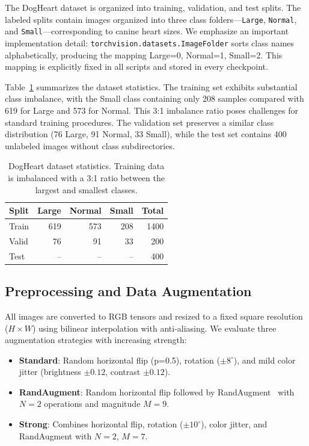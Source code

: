 \documentclass[10pt,twocolumn,letterpaper]{article}
\begin{document}
The DogHeart dataset is organized into training, validation, and test splits. The labeled splits contain images organized into three class folders---\texttt{Large}, \texttt{Normal}, and \texttt{Small}---corresponding to canine heart sizes. We emphasize an important implementation detail: \texttt{torchvision.datasets.ImageFolder} sorts class names alphabetically, producing the mapping Large=0, Normal=1, Small=2. This mapping is explicitly fixed in all scripts and stored in every checkpoint.

Table~\ref{tab:data} summarizes the dataset statistics. The training set exhibits substantial class imbalance, with the Small class containing only 208 samples compared with 619 for Large and 573 for Normal. This 3:1 imbalance ratio poses challenges for standard training procedures. The validation set preserves a similar class distribution (76 Large, 91 Normal, 33 Small), while the test set contains 400 unlabeled images without class subdirectories.

\begin{table}[h]
\small
\centering
\caption{DogHeart dataset statistics. Training data is imbalanced with a 3:1 ratio between the largest and smallest classes.}
\label{tab:data}
\begin{tabular}{lrrrr}
\toprule
Split & Large & Normal & Small & Total \\
\midrule
Train & 619 & 573 & 208 & 1400 \\
Valid & 76  & 91  & 33  & 200 \\
Test  & --  & --  & --  & 400 \\
\bottomrule
\end{tabular}
\end{table}

\subsection{Preprocessing and Data Augmentation}

All images are converted to RGB tensors and resized to a fixed square resolution ($H\times W$) using bilinear interpolation with anti-aliasing. We evaluate three augmentation strategies with increasing strength:

\begin{itemize}
    \item \textbf{Standard}: Random horizontal flip (p=0.5), rotation ($\pm 8^\circ$), and mild color jitter (brightness $\pm 0.12$, contrast $\pm 0.12$).
    \item \textbf{RandAugment}: Random horizontal flip followed by RandAugment~\cite{randaugment2019} with $N=2$ operations and magnitude $M=9$.
    \item \textbf{Strong}: Combines horizontal flip, rotation ($\pm 10^\circ$), color jitter, and RandAugment with $N=2$, $M=7$.
\end{itemize}
\end{document}
